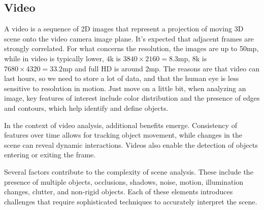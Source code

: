 \subsection{Video}
A video is a sequence of 2D images that represent a projection of moving 3D scene onto the video camera image plane. It's expected that adjacent frames are strongly correlated.
For what concerns the resolution, the images are up to 50mp, while in video is typically lower, $4$k is $3840\times2160=8.3$mp, $8$k is $7680\times4320=33.2$mp and full HD is around $2$mp.
The reasons are that video can last hours, so we need to store a lot of data, and that the human eye is less sensitive to resolution in motion. 
Just move on a little bit, when analyzing an image, key features of interest include color distribution and the presence of edges and contours, which help identify and define objects.

In the context of video analysis, additional benefits emerge. Consistency of features over time allows for tracking object movement, while changes in the scene can reveal dynamic interactions. Videos also enable the detection of objects entering or exiting the frame.

Several factors contribute to the complexity of scene analysis. These include the presence of multiple objects, occlusions, shadows, noise, motion, illumination changes, clutter, and non-rigid objects. Each of these elements introduces challenges that require sophisticated techniques to accurately interpret the scene.
